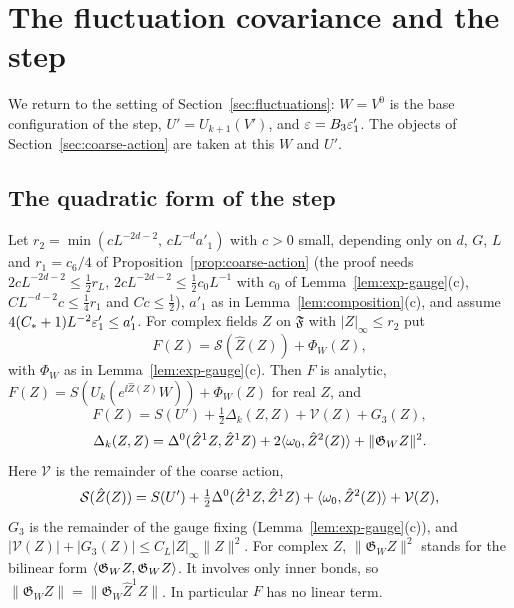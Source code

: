 \section{The fluctuation covariance and the step}\label{sec:covariance}

We return to the setting of Section~\ref{sec:fluctuations}: $W=V^0$ is the base configuration of the step, $U'=U_{k+1}(V')$, and $\varepsilon=B_3\varepsilon'_1$. The objects of Section~\ref{sec:coarse-action} are taken at this $W$ and $U'$.

\subsection{The quadratic form of the step}\label{ss:34.1}

\begin{lemma}\label{lem:step-quadratic}
Let $r_2=\min(cL^{-2d-2},\,cL^{-d}a'_1)$ with $c>0$ small, depending only on $d$, $G$, $L$ and $r_1=c_6/4$ of Proposition~\ref{prop:coarse-action} (the proof needs $2cL^{-2d-2}\le\frac12r_L$, $2cL^{-2d-2}\le\frac12c_0L^{-1}$ with $c_0$ of Lemma~\ref{lem:exp-gauge}(c), $CL^{-d-2}c\le\frac14r_1$ and $Cc\le\frac12$), $a'_1$ as in Lemma~\ref{lem:composition}(c), and assume $4(C_*+1)L^{-2}\varepsilon'_1\le a'_1$. For complex fields $Z$ on $\mathfrak F$ with $|Z|_\infty\le r_2$ put
\[
F(Z)=\mathcal S(\hat Z(Z))+\Phi_W(Z),
\]
with $\Phi_W$ as in Lemma~\ref{lem:exp-gauge}(c). Then $F$ is analytic, $F(Z)=S(U_k(e^{\ii\hat Z(Z)}W))+\Phi_W(Z)$ for real $Z$, and
\[
F(Z)=S(U')+\tfrac12\Delta_k(Z,Z)+\mathcal V(Z)+G_3(Z),
\]
\[
\Delta_k(Z,Z)=\Delta^0(\hat Z^1Z,\hat Z^1Z)+2\langle \omega_0,\hat Z^2(Z)\rangle+\|\mathfrak G_WZ\|^2 .
\]
Here $\mathcal V$ is the remainder of the coarse action,
\[
\mathcal S(\hat Z(Z))=S(U')+\tfrac12\Delta^0(\hat Z^1Z,\hat Z^1Z)+\langle \omega_0,\hat Z^2(Z)\rangle+\mathcal V(Z),
\]
$G_3$ is the remainder of the gauge fixing (Lemma~\ref{lem:exp-gauge}(c)), and $|\mathcal V(Z)|+|G_3(Z)|\le C_L|Z|_\infty\|Z\|^2$. For complex $Z$, $\|\mathfrak G_WZ\|^2$ stands for the bilinear form $\langle \mathfrak G_WZ,\mathfrak G_WZ\rangle$. It involves only inner bonds, so $\|\mathfrak G_WZ\|=\|\mathfrak G_W\hat Z^1Z\|$. In particular $F$ has no linear term.
\end{lemma}

